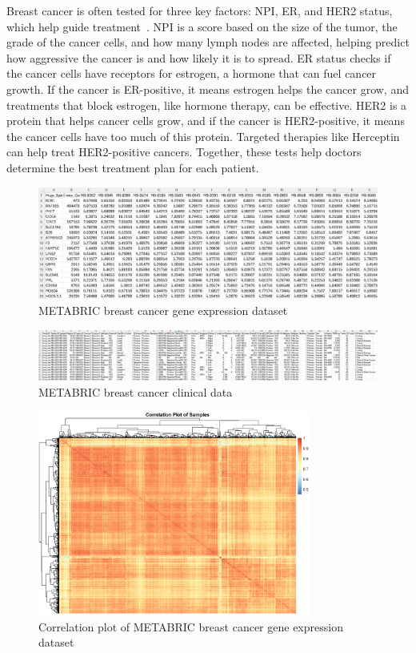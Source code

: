 \documentclass{statsoc}
\begin{document}
Breast cancer is often tested for three key factors: NPI, ER, and HER2 status, which help guide treatment~\citep{haybittle1982prognostic, jensen1973estrogen, di1987erb}. NPI is a score based on the size of the tumor, the grade of the cancer cells, and how many lymph nodes are affected, helping predict how aggressive the cancer is and how likely it is to spread. ER status checks if the cancer cells have receptors for estrogen, a hormone that can fuel cancer growth. If the cancer is ER-positive, it means estrogen helps the cancer grow, and treatments that block estrogen, like hormone therapy, can be effective. HER2 is a protein that helps cancer cells grow, and if the cancer is HER2-positive, it means the cancer cells have too much of this protein. Targeted therapies like Herceptin can help treat HER2-positive cancers. Together, these tests help doctors determine the best treatment plan for each patient.

\begin{figure}[h!]
    \centering
    \includegraphics[width=\textwidth]{metabric_expr.png}
    \caption{METABRIC breast cancer gene expression dataset}
    \label{fig:metabric_expr}
\end{figure}

\begin{figure}[h!]
    \centering
    \includegraphics[width=\textwidth]{metabric_data.png}
    \caption{METABRIC breast cancer clinical data}
    \label{fig:metabric_data}
\end{figure}

\begin{figure}[h!]
    \centering
    \includegraphics[width=0.8\textwidth]{metabric_corr.png}
    \caption{Correlation plot of METABRIC breast cancer gene expression dataset}
    \label{fig:metabric_corr}
\end{figure}
\end{document}
